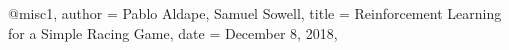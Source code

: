 @misc{1,
	author = {Pablo Aldape, Samuel Sowell},
	title = {Reinforcement Learning for a Simple Racing Game},
	date = {December 8, 2018},
}
